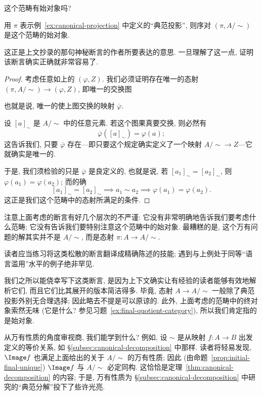 这个范畴有始对象吗?

\begin{claim}
\label{claim:quotient-universal}
用 $\pi$ 表示例~\ref{ex:canonical-projection} 中定义的``典范投影'', 则序对 $(\pi, A/{\sim})$ 是这个范畴的始对象.
\end{claim}

这正是上文抄录的那句神秘断言的作者所要表达的意思. 一旦理解了这一点, 证明该断言确实正确就非常容易了.

\begin{proof}
考虑任意如上的 $(\varphi, Z)$. 我们必须证明存在唯一的态射 $(\pi, A/{\sim}) \to (\varphi, Z)$, 即唯一的交换图
\begin{center}
\end{center}
也就是说, 唯一的使上图交换的映射 $\overline{\varphi}$.

设 $[a]_{\sim}$ 是 $A/{\sim}$ 中的任意元素. 若这个图果真要交换, 则必然有
\[
\overline{\varphi}([a]_{\sim}) = \varphi(a);
\]
这告诉我们, 只要 $\overline{\varphi}$ 存在---即只要这个规定确实定义了一个映射 $A/{\sim} \to Z$---它就确实是唯一的.

于是, 我们须检验的只是 $\overline{\varphi}$ 是良定义的, 也就是说, 若 $[a_1]_{\sim} = [a_2]_{\sim}$, 则 $\varphi(a_1) = \varphi(a_2)$; 而的确
\[
[a_1]_{\sim} = [a_2]_{\sim} \implies a_1 \sim a_2 \implies \varphi(a_1) = \varphi(a_2).
\]
这正是我们这个范畴中的态射所满足的条件.
\end{proof}

注意上面考虑的断言有好几个层次的不严谨: 它没有非常明确地告诉我们要考虑什么范畴; 它没有告诉我们要特别注意这个范畴中的始对象. 最糟糕的是, 这个万有问题的解其实并不是 $A/{\sim}$, 而是态射 $\pi : A \to A/{\sim}$.

读者应当练习将这类松散的断言翻译成精确陈述的技能; 遇到与上例处于同等``语言滥用''水平的例子绝非罕见.

我们之所以能侥幸写下这类断言, 是因为上下文确实让有经验的读者能够有效地解析它们, 而且它们比其展开的版本简洁得多. 毕竟, 态射 $A \rightarrow A/{\sim}$ 一般除了典范投影外别无合理选择; 因此略去不提是可以原谅的. 此外, 上面考虑的范畴中的终对象索然无味 (它是什么? 参见习题~\ref{ex:final-quotient-category}), 所以我们肯定指的是始对象.

从万有性质的角度审视商, 我们能学到什么? 例如, 设 $\sim$ 是从映射 $f : A \to B$ 出发定义的等价关系, 如 \S\ref{subsec:canonical-decomposition} 中那样. 读者将轻易发现, $\Image f$ 也满足上面给出的关于 $A/{\sim}$ 的万有性质; 因此 (由命题~\ref{prop:initial-final-unique}) $\Image f$ 与 $A/{\sim}$ 必定同构. 这恰恰是定理~\ref{thm:canonical-decomposition} 的内容; 于是, 万有性质为 \S\ref{subsec:canonical-decomposition} 中研究的``典范分解''投下了些许光亮.

